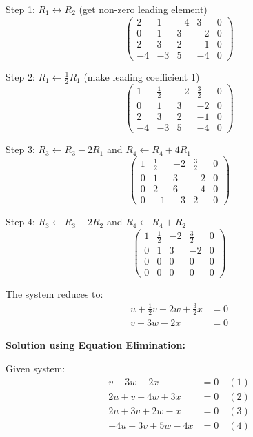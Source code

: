 \documentclass[12pt]{article}
\begin{document}
Step 1: $R_1 \leftrightarrow R_2$ (get non-zero leading element)
\[
\left(\begin{array}{cccc|c}
2 & 1 & -4 & 3 & 0\\
0 & 1 & 3 & -2 & 0\\
2 & 3 & 2 & -1 & 0\\
-4 & -3 & 5 & -4 & 0
\end{array}\right)
\]

Step 2: $R_1 \leftarrow \frac{1}{2}R_1$ (make leading coefficient 1)
\[
\left(\begin{array}{cccc|c}
1 & \frac{1}{2} & -2 & \frac{3}{2} & 0\\
0 & 1 & 3 & -2 & 0\\
2 & 3 & 2 & -1 & 0\\
-4 & -3 & 5 & -4 & 0
\end{array}\right)
\]

Step 3: $R_3 \leftarrow R_3 - 2R_1$ and $R_4 \leftarrow R_4 + 4R_1$
\[
\left(\begin{array}{cccc|c}
1 & \frac{1}{2} & -2 & \frac{3}{2} & 0\\
0 & 1 & 3 & -2 & 0\\
0 & 2 & 6 & -4 & 0\\
0 & -1 & -3 & 2 & 0
\end{array}\right)
\]

Step 4: $R_3 \leftarrow R_3 - 2R_2$ and $R_4 \leftarrow R_4 + R_2$
\[
\left(\begin{array}{cccc|c}
1 & \frac{1}{2} & -2 & \frac{3}{2} & 0\\
0 & 1 & 3 & -2 & 0\\
0 & 0 & 0 & 0 & 0\\
0 & 0 & 0 & 0 & 0
\end{array}\right)
\]

The system reduces to:
\begin{align*}
u + \frac{1}{2}v - 2w + \frac{3}{2}x &= 0\\
v + 3w - 2x &= 0
\end{align*}

\textbf{Solution using Equation Elimination:}

Given system:
\begin{align}
v + 3w - 2x &= 0 \quad (1)\\
2u + v - 4w + 3x &= 0 \quad (2)\\
2u + 3v + 2w - x &= 0 \quad (3)\\
-4u - 3v + 5w - 4x &= 0 \quad (4)
\end{align}
\end{document}
